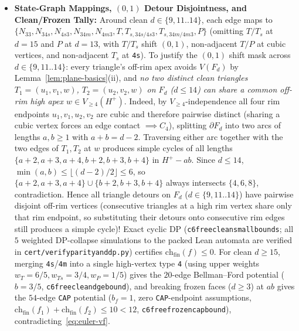 \documentclass[11pt,reqno]{amsart}
\theoremstyle{plain}
\theoremstyle{definition}
\theoremstyle{remark}
\newcommand{\chf}{\mathrm{ch}_{\mathrm{fin}}}
\newcommand{\Vge}{V_{\ge 4}}
\DeclareRobustCommand{\_}{\ifmmode\text{\textunderscore}\else\textunderscore\allowbreak\fi}
\begin{document}
\begin{itemize}[leftmargin=1.8em]
  \item \textbf{State-Graph Mappings, $(0,1)$ Detour Disjointness, and Clean/Frozen Tally:} Around clean $d \in \{9, 11..14\}$, each edge maps to $\{N_{33},\allowbreak N_{34s},\allowbreak N_{4s3},\allowbreak N_{34m},\allowbreak N_{4m3},\allowbreak T,\allowbreak T_{s,34s/4s3},\allowbreak T_{s,34m/4m3},\allowbreak P\}$ (omitting $T/T_s$ at $d=15$ and $P$ at $d=13$, with $T/T_s$ shift $(0,1)$, non-adjacent $T/P$ at cubic vertices, and non-adjacent $T_s$ at \texttt{4s}). To justify the $(0, 1)$ shift mask across $d \in \{9, 11..14\}$: every triangle's off-rim apex avoids $V(F_d)$ by Lemma~\ref{lem:plane-basics}(ii), and \emph{no two distinct clean triangles $T_1 = (u_1, v_1, w)$, $T_2 = (u_2, v_2, w)$ on $F_d$ ($d \le 14$) can share a common off-rim high apex $w \in \Vge(H^+)$}. Indeed, by $\Vge$-independence all four rim endpoints $u_1, v_1, u_2, v_2$ are cubic and therefore pairwise distinct (sharing a cubic vertex forces an edge contact $\implies C_4$), splitting $\partial F_d$ into two arcs of lengths $a, b \ge 1$ with $a + b = d - 2$. Traversing either arc together with the two edges of $T_1, T_2$ at $w$ produces simple cycles of all lengths $\{a+2, a+3, a+4, b+2, b+3, b+4\}$ in $H^+ - ab$. Since $d \le 14$, $\min(a, b) \le \lfloor (d-2)/2 \rfloor \le 6$, so $\{a+2, a+3, a+4\} \cup \{b+2, b+3, b+4\}$ always intersects $\{4, 6, 8\}$, contradiction. Hence all triangle detours on $F_d$ ($d \in \{9, 11..14\}$) have pairwise disjoint off-rim vertices (consecutive triangles at a high rim vertex share only that rim endpoint, so substituting their detours onto consecutive rim edges still produces a simple cycle)! Exact cyclic DP (\texttt{c6free\_clean\_small\_bounds}; all $5$ weighted DP-collapse simulations to the packed Lean automata are verified in \texttt{cert/verify\_parity\_and\_dp.py}) certifies $\chf(f) \le 0$. For clean $d \ge 15$, merging \texttt{4s}/\texttt{4m} into a single high-vertex type \texttt{4} (using upper weights $w_T = 6/5, w_{Ts} = 3/4, w_P = 1/5$) gives the $20$-edge Bellman--Ford potential ($b = 3/5$, \texttt{c6free\_clean\_d\_ge\_15\_bound}), and breaking frozen faces ($d \ge 3$) at $ab$ gives the $54$-edge \texttt{CAP} potential ($b_f = 1$, zero \texttt{CAP}-endpoint assumptions, $\chf(f_1) + \chf(f_2) \le 10 < 12$, \texttt{c6free\_frozen\_cap\_bound}), contradicting~\eqref{eq:euler-vf}.
\end{itemize}
\end{document}
